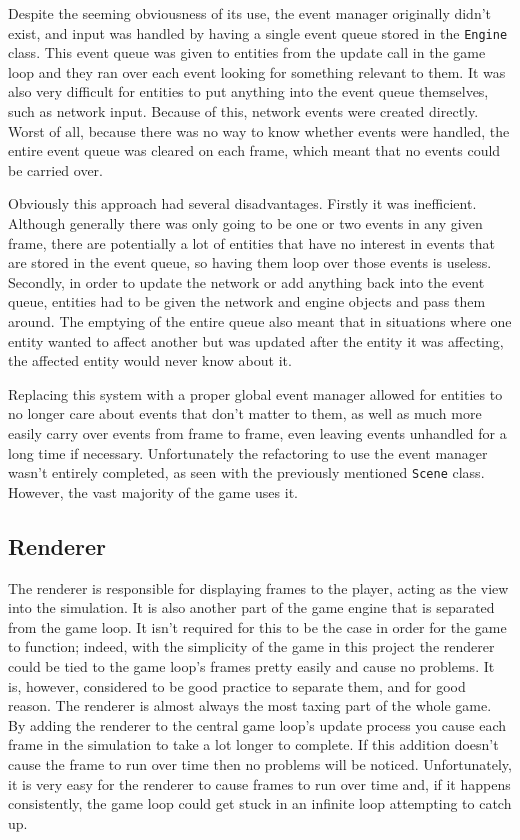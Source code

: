 Despite the seeming obviousness of its use, the event manager originally didn't exist, and input was handled by having a single event queue stored in the \texttt{Engine} class. This event queue was given to entities from the update call in the game loop and they ran over each event looking for something relevant to them. It was also very difficult for entities to put anything into the event queue themselves, such as network input. Because of this, network events were created directly. Worst of all, because there was no way to know whether events were handled, the entire event queue was cleared on each frame, which meant that no events could be carried over.

Obviously this approach had several disadvantages. Firstly it was inefficient. Although generally there was only going to be one or two events in any given frame, there are potentially a lot of entities that have no interest in events that are stored in the event queue, so having them loop over those events is useless. Secondly, in order to update the network or add anything back into the event queue, entities had to be given the network and engine objects and pass them around. The emptying of the entire queue also meant that in situations where one entity wanted to affect another but was updated after the entity it was affecting, the affected entity would never know about it.

Replacing this system with a proper global event manager allowed for entities to no longer care about events that don't matter to them, as well as much more easily carry over events from frame to frame, even leaving events unhandled for a long time if necessary. Unfortunately the refactoring to use the event manager wasn't entirely completed, as seen with the previously mentioned \texttt{Scene} class. However, the vast majority of the game uses it.

\subsection{Renderer}\label{design_renderer}
The renderer is responsible for displaying frames to the player, acting as the view into the simulation. It is also another part of the game engine that is separated from the game loop. It isn't required for this to be the case in order for the game to function; indeed, with the simplicity of the game in this project the renderer could be tied to the game loop's frames pretty easily and cause no problems. It is, however, considered to be good practice to separate them, and for good reason. The renderer is almost always the most taxing part of the whole game. By adding the renderer to the central game loop's update process you cause each frame in the simulation to take a lot longer to complete. If this addition doesn't cause the frame to run over time then no problems will be noticed. Unfortunately, it is very easy for the renderer to cause frames to run over time and, if it happens consistently, the game loop could get stuck in an infinite loop attempting to catch up.

